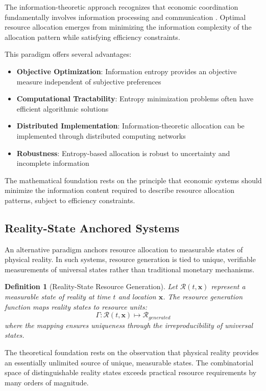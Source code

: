 \documentclass[12pt,a4paper]{article}
\newtheorem{definition}[theorem]{Definition}
\begin{document}
The information-theoretic approach recognizes that economic coordination fundamentally involves information processing and communication \cite{shannon1948,jaynes1957}. Optimal resource allocation emerges from minimizing the information complexity of the allocation pattern while satisfying efficiency constraints.

This paradigm offers several advantages:
\begin{itemize}
\item \textbf{Objective Optimization}: Information entropy provides an objective measure independent of subjective preferences
\item \textbf{Computational Tractability}: Entropy minimization problems often have efficient algorithmic solutions
\item \textbf{Distributed Implementation}: Information-theoretic allocation can be implemented through distributed computing networks
\item \textbf{Robustness}: Entropy-based allocation is robust to uncertainty and incomplete information
\end{itemize}

The mathematical foundation rests on the principle that economic systems should minimize the information content required to describe resource allocation patterns, subject to efficiency constraints.

\subsection{Reality-State Anchored Systems}

An alternative paradigm anchors resource allocation to measurable states of physical reality. In such systems, resource generation is tied to unique, verifiable measurements of universal states rather than traditional monetary mechanisms.

\begin{definition}[Reality-State Resource Generation]
Let $\mathcal{R}(t,\mathbf{x})$ represent a measurable state of reality at time $t$ and location $\mathbf{x}$. The resource generation function maps reality states to resource units:
\begin{equation}
\Gamma : \mathcal{R}(t,\mathbf{x}) \mapsto \mathcal{R}_{generated}
\end{equation}
where the mapping ensures uniqueness through the irreproducibility of universal states.
\end{definition}

The theoretical foundation rests on the observation that physical reality provides an essentially unlimited source of unique, measurable states. The combinatorial space of distinguishable reality states exceeds practical resource requirements by many orders of magnitude.
\end{document}
